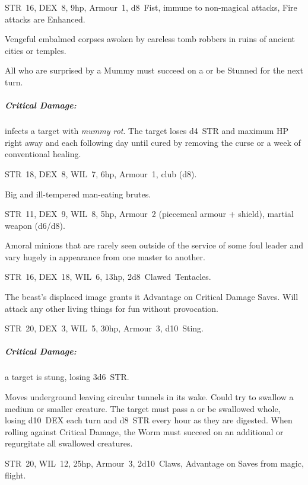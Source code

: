 \documentclass[itdr]{subfiles}
\begin{document}
\vfill

STR~16, DEX~8, 9hp, Armour~1, d8~Fist, immune to non-magical attacks, Fire attacks are Enhanced.

Vengeful embalmed corpses awoken by careless tomb robbers in ruins of ancient cities or temples.

All who are surprised by a Mummy must succeed on a  or be Stunned for the next turn.

\subparagraph{Critical Damage:} infects a target with {\em mummy rot}. The target loses d4~STR and maximum HP right away and each following day until cured by removing the curse or a week of conventional healing.

\vfill

STR~18, DEX~8, WIL~7, 6hp, Armour~1, club (d8).

Big and ill-tempered man-eating brutes.

\vfill

STR~11, DEX~9, WIL~8, 5hp, Armour~2 (piecemeal armour + shield), martial weapon (d6/d8).

Amoral minions that are rarely seen outside of the service of some foul leader and vary hugely in appearance from one master to another.

\vfill

STR~16, DEX~18, WIL~6, 13hp, 2d8~Clawed~Tentacles.

The beast's displaced image grants it Advantage on Critical Damage Saves. Will attack any other living things for fun without provocation.

\break

\vfill
{}

STR~20, DEX~3, WIL~5, 30hp, Armour~3, d10~Sting.

\subparagraph{Critical Damage:} a target is stung, losing 3d6~STR.

Moves underground leaving circular tunnels in its wake. Could try to swallow a medium or smaller creature. The target must pass a  or be swallowed whole, losing d10~DEX each turn and d8~STR every hour as they are digested. When rolling against Critical Damage, the Worm must succeed on an additional  or regurgitate all swallowed creatures.

\vfill

STR~20, WIL~12, 25hp, Armour~3, 2d10~Claws, \mbox{Advantage} on Saves from magic, flight.
\end{document}
